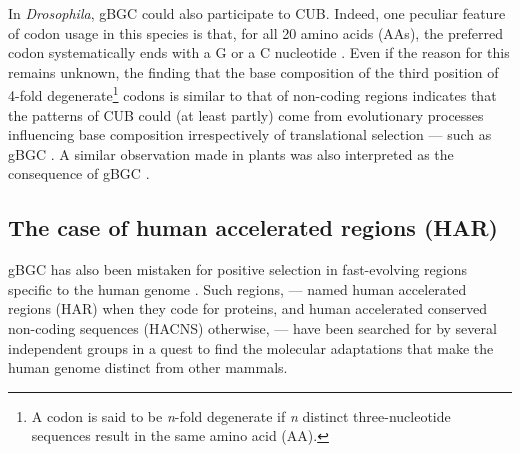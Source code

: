 In \textit{Drosophila}, gBGC could also participate to CUB\@.
Indeed, one peculiar feature of codon usage in this species is that, for all 20 amino acids (AAs), the preferred codon systematically ends with a G or a C nucleotide \citep[reviewed in][]{duret2009biased}.
Even if the reason for this remains unknown, the finding that the base composition of the third position of 4-fold degenerate\footnote{A codon is said to be \textit{n}-fold degenerate if \textit{n} distinct three-nucleotide sequences result in the same amino acid (AA).} codons is similar to that of non-coding regions \citep{clay2011gc3} indicates that the patterns of CUB could (at least partly) come from evolutionary processes influencing base composition irrespectively of translational selection — such as gBGC \citep{duret2002evolution}. 
A similar observation made in plants was also interpreted as the consequence of gBGC \citep{clement2017evolutionary}.





\subsection{The case of human accelerated regions (HAR)}

gBGC has also been mistaken for positive selection in fast-evolving regions specific to the human genome \citep[reviewed in][]{duret2009biased}.
Such regions, — named human accelerated regions (HAR) when they code for proteins, and human accelerated conserved non-coding sequences (HACNS) otherwise, — have been searched for by several independent groups \citep{pollard2006forces,pollard2006rna,prabhakar2006accelerated,bird2007fastevolving,bush2008genomewide,lindblad-toh2011highresolution} in a quest to find the molecular adaptations that make the human genome distinct from other mammals.

